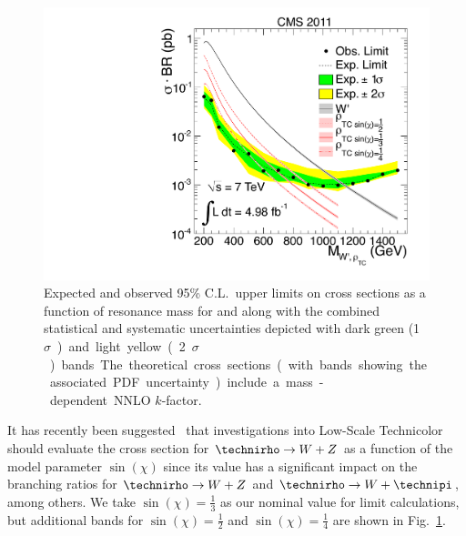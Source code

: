 \begin{figure}
  \centering
  \includegraphics[width=\plotwidth]{figures/limit-vs-mass}
  \caption[Expected and observed upper limits on cross sections as a function of resonance mass]{Expected and observed 95\% C.L.\ upper limits on cross sections as a function of resonance mass for \wprime and \technirho along with the combined statistical and systematic uncertainties depicted with dark green (\SI{1}{$\sigma$}) and light yellow (\SI{2}{$\sigma$}) bands.  The theoretical cross sections (with bands showing the associated PDF uncertainty) include a mass-dependent NNLO $k$-factor.}
  \label{fig:limit-vs-mass}
\end{figure}

It has recently been suggested~\cite{Eichten:2012br} that investigations into Low-Scale Technicolor should evaluate the cross section for $\technirho \to W + Z$ as a function of the model parameter $\sin(\chi)$ since its value has a significant impact on the branching ratios for $\technirho \to W + Z$ and $\technirho \to W + \technipi$, among others.  We take $\sin(\chi) = \frac{1}{3}$ as our nominal value for limit calculations, but additional bands for $\sin(\chi) = \frac{1}{2}$ and $\sin(\chi) = \frac{1}{4}$ are shown in Fig.~\ref{fig:limit-vs-mass}.


